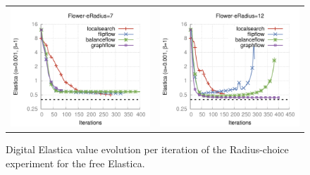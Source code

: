 \begin{figure}
\begin{tabular}{cc}
\includegraphics[scale=0.4]{figures/chapter9/free-elastica/plots/iteration/radius_choice/len_pen_0.001/radius-7/flower.pdf} & 
\includegraphics[scale=0.4]{figures/chapter9/free-elastica/plots/iteration/radius_choice/len_pen_0.001/radius-12/flower.pdf}
\end{tabular}
\caption{Digital Elastica value evolution per iteration of the Radius-choice experiment for the free Elastica.}
\label{ch9:fig:plots-free-elastica-radius-choice}
\end{figure}


